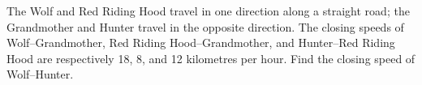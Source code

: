 The Wolf and Red Riding Hood travel in one direction along a straight road; the Grandmother and Hunter travel in the opposite direction. The closing speeds of Wolf--Grandmother, Red Riding Hood--Grandmother, and Hunter--Red Riding Hood are respectively 18, 8, and 12 kilometres per hour. Find the closing speed of Wolf--Hunter.
